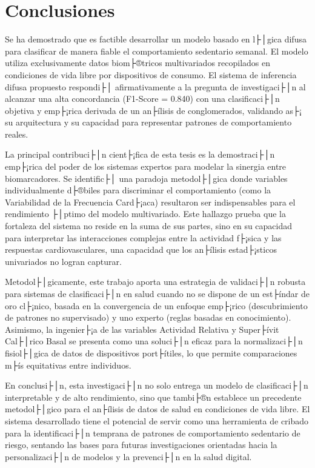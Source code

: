﻿\chapter{Conclusiones}
\label{chap:conclusiones}

\noindent Se ha demostrado que es factible desarrollar un modelo basado en l├│gica difusa para clasificar de manera fiable el comportamiento sedentario semanal. El modelo utiliza exclusivamente datos biom├®tricos multivariados recopilados en condiciones de vida libre por dispositivos de consumo. El sistema de inferencia difusa propuesto respondi├│ afirmativamente a la pregunta de investigaci├│n al alcanzar una alta concordancia (F1-Score = 0.840) con una clasificaci├│n objetiva y emp├¡rica derivada de un an├ílisis de conglomerados, validando as├¡ su arquitectura y su capacidad para representar patrones de comportamiento reales.

La principal contribuci├│n cient├¡fica de esta tesis es la demostraci├│n emp├¡rica del poder de los sistemas expertos para modelar la sinergia entre biomarcadores. Se identific├│ una paradoja metodol├│gica donde variables individualmente d├®biles para discriminar el comportamiento (como la Variabilidad de la Frecuencia Card├¡aca) resultaron ser indispensables para el rendimiento ├│ptimo del modelo multivariado. Este hallazgo prueba que la fortaleza del sistema no reside en la suma de sus partes, sino en su capacidad para interpretar las interacciones complejas entre la actividad f├¡sica y las respuestas cardiovasculares, una capacidad que los an├ílisis estad├¡sticos univariados no logran capturar.

Metodol├│gicamente, este trabajo aporta una estrategia de validaci├│n robusta para sistemas de clasificaci├│n en salud cuando no se dispone de un est├índar de oro cl├¡nico, basada en la convergencia de un enfoque emp├¡rico (descubrimiento de patrones no supervisado) y uno experto (reglas basadas en conocimiento). Asimismo, la ingenier├¡a de las variables Actividad Relativa y Super├ívit Cal├│rico Basal se presenta como una soluci├│n eficaz para la normalizaci├│n fisiol├│gica de datos de dispositivos port├ítiles, lo que permite comparaciones m├ís equitativas entre individuos.

En conclusi├│n, esta investigaci├│n no solo entrega un modelo de clasificaci├│n interpretable y de alto rendimiento, sino que tambi├®n establece un precedente metodol├│gico para el an├ílisis de datos de salud en condiciones de vida libre. El sistema desarrollado tiene el potencial de servir como una herramienta de cribado para la identificaci├│n temprana de patrones de comportamiento sedentario de riesgo, sentando las bases para futuras investigaciones orientadas hacia la personalizaci├│n de modelos y la prevenci├│n en la salud digital.
